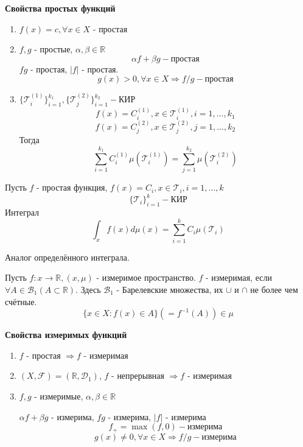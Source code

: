 \textbf{Свойства простых функций}
\begin{enumerate}
	\item $f(x) = c, \forall x \in X$ - простая
	\item $f, g$ - простые,  $\alpha, \beta \in \mathbb{R}$
	\[ \alpha f + \beta g - \text{простая} \]
	$fg$ - простая, $|f|$ - простая.
	\[ g(x) > 0, \forall x \in X \Rightarrow f/g - \text{простая} \]
	\item $\{ \mathcal{T}_i^{(1)} \}_{i=1}^{k_1}, \{ \mathcal{T}_j^{(2)} \}_{i=1}^{k_2} - \text{КИР}$
	\[ f(x) = C_i^{(1)}, x \in \mathcal{T}_i^{(1)}, i = 1, \dots, k_1 \]
	\[ f(x) = C_j^{(2)}, x \in \mathcal{T}_j^{(2)}, j = 1, \dots, k_2 \]
	Тогда
	\[ \sum_{i=1}^{k_1} C_i^{(1)} \mu (\mathcal{T}_i^{(1)}) = \sum_{j=1}^{k_2} \mu (\mathcal{T}_i^{(2)}) \]
\end{enumerate}

\begin{definition}[Интеграл]
	Пусть $f$ - простая функция, $f(x) = C_i, x \in \mathcal{T}_i, i = 1, \dots, k$
	\[ \{ \mathcal{T}_i \}_{i=1}^{k} - \text{КИР} \]
	Интеграл
	\[ \int_{x} f(x) d \mu(x) = \sum_{i=1}^{k} C_i \mu (\mathcal{T}_i) \]
\end{definition}
\begin{remark}
	Аналог определённого интеграла.
\end{remark}

\begin{definition}
	Пусть $f: x \to \mathbb{R}, (x, \mu)$ - измеримое пространство. $f$ - измеримая, если $\forall A \in \mathcal{B}_1 (A \subset \mathbb{R})$. Здесь $\mathcal{B}_1$ - Барелевские множества, их $\cup$ и $\cap$ не более чем счётные.
	\[ \{ x\in X: f(x) \in A \} (= f^{-1} (A)) \in \mu \]
\end{definition}

\textbf{Свойства измеримых функций}
\begin{enumerate}
	\item $f$ - простая $\Rightarrow f$ - измеримая
	\item $(X, \mathcal{F}) = (\mathbb{R}, \mathcal{D}_1)$, $f$ - непрерывная $\Rightarrow f$ - измеримая
	\item $f, g$ - измеримые, $\alpha, \beta \in \mathbb{R}$
	
	$\alpha f + \beta g$ - измерима, $fg$ - измерима, $|f|$ - измерима
	\[ f_+ = \max (f, 0) - \text{измерима} \]
	\[ g(x) \ne 0, \forall x \in X \Rightarrow f/g - \text{измерима} \]
\end{enumerate}

